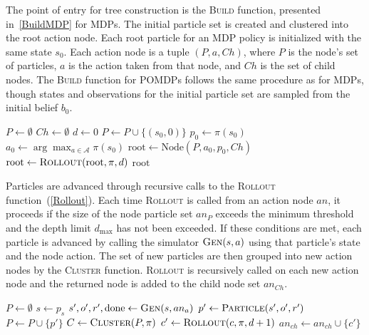 \documentclass[letterpaper]{article} %
\begin{document}
The point of entry for tree construction is the \textsc{Build} function, presented in~\cref{BuildMDP} for MDPs.
The initial particle set is created and clustered into the root action node.
Each root particle for an MDP policy is initialized with the same state $s_0$.
Each action node is a tuple $(P, a, Ch)$, where $P$ is the node's set of particles, $a$ is the action taken from that node, and $Ch$ is the set of child nodes.
The \textsc{Build} function for POMDPs follows the same procedure as for MDPs, though states and observations for the initial particle set are sampled from the initial belief $b_0$.
\begin{algorithm}[htb]
\caption{Build MDP}\label{BuildMDP}
\begin{algorithmic}[1]
\State $P \gets \emptyset$
\State $Ch \gets \emptyset$
\State $d \gets 0$
\State $P \gets P \cup \{ (s_0, 0) \}$
\EndFor
\State $p_0 \gets \pi(s_0)$
\State $a_0 \gets \arg\max_{a \in \mathcal{A}} \pi(s_0)$
\State $\text{root} \gets \text{Node}(P, a_0, p_0, Ch)$
\State $\text{root} \gets \textsc{Rollout}(\text{root}, \pi, d)$
\State \Return $\text{root}$
\EndProcedure
\end{algorithmic}
\end{algorithm}


Particles are advanced through recursive calls to the \textsc{Rollout} function~(\cref{Rollout}).
Each time \textsc{Rollout} is called from an action node $an$, it proceeds if the size of the node particle set $an_P$ exceeds the minimum threshold and the depth limit $d_{\max}$ has not been exceeded.
If these conditions are met, each particle is advanced by calling the simulator $\textsc{Gen}(s, a)$ using that particle's state and the node action.
The set of new particles are then grouped into new action nodes by the \textsc{Cluster} function.
\textsc{Rollout} is recursively called on each new action node and the returned node is added to the child node set $an_{Ch}$.
\begin{algorithm}[ht]
\caption{Rollout}\label{Rollout}
\begin{algorithmic}[1]
\State $P \gets \emptyset$
\State $s \gets p_s$
\State $s', o', r', \text{done} \gets \textsc{Gen}(s, an_a)$
\State $p' \gets \textsc{Particle}(s', o', r')$
\State $P \gets P \cup \{ p' \}$
\EndIf
\EndFor
\State $C \gets \textsc{Cluster}(P, \pi)$
\State $c' \gets \textsc{Rollout}(c, \pi, d + 1)$
\State $an_{ch} \gets an_{ch} \cup \{ c' \}$
\EndFor
\EndIf
\State \Return {}
\EndProcedure
\end{algorithmic}
\end{algorithm}
\end{document}
